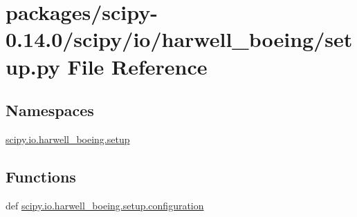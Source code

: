 \hypertarget{packages_2scipy-0_814_80_2scipy_2io_2harwell__boeing_2setup_8py}{}\section{packages/scipy-\/0.14.0/scipy/io/harwell\+\_\+boeing/setup.py File Reference}
\label{packages_2scipy-0_814_80_2scipy_2io_2harwell__boeing_2setup_8py}
\subsection*{Namespaces}
\begin{DoxyCompactItemize}
\item 
 \hyperlink{namespacescipy_1_1io_1_1harwell__boeing_1_1setup}{scipy.\+io.\+harwell\+\_\+boeing.\+setup}
\end{DoxyCompactItemize}
\subsection*{Functions}
\begin{DoxyCompactItemize}
\item 
def \hyperlink{namespacescipy_1_1io_1_1harwell__boeing_1_1setup_a619cbc2258838111b6c876d83d098ec3}{scipy.\+io.\+harwell\+\_\+boeing.\+setup.\+configuration}
\end{DoxyCompactItemize}
